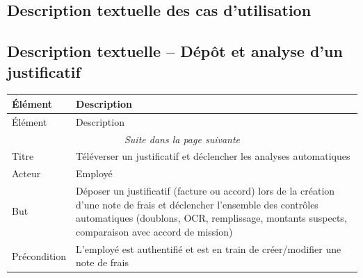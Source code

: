 \documentclass[12pt,a4paper]{report}
\begin{document}
\newpage
\subsection{Description textuelle des cas d'utilisation}



\subsection*{Description textuelle -- Dépôt et analyse d'un justificatif}


\label{tab:upload_justificatif_desc}

\begin{longtable}{|p{3cm}|p{11cm}|}

\hline

Élément & Description \\

\hline

\endfirsthead

\hline

Élément & Description \\

\hline

\endhead

\hline

\multicolumn{2}{|c|}{\textit{Suite dans la page suivante}} \\

\hline

\endfoot

\hline

\endlastfoot

Titre & Téléverser un justificatif et déclencher les analyses automatiques \\

\hline

Acteur & Employé \\

\hline

But & Déposer un justificatif (facture ou accord) lors de la création d'une note de frais et déclencher l'ensemble des contrôles automatiques (doublons, OCR, remplissage, montants suspects, comparaison avec accord de mission) \\

\hline

Précondition & L'employé est authentifié et est en train de créer/modifier une note de frais \\


\end{longtable}
\end{document}
